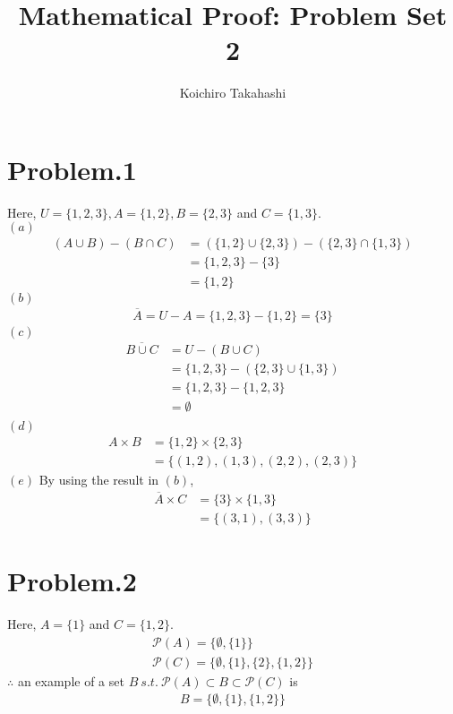 \documentclass[12pt]{article}
\begin{document}
\title{Mathematical Proof: Problem Set 2}
\author{Koichiro Takahashi}
\maketitle 

\section*{Problem.1}
Here, $U = \{1,2,3\}, A = \{1,2\}, B = \{2,3\}$ and $C = \{1,3\}$.\\[1em]
$(a)$
\begin{align*}
(A \cup B) - (B \cap C) &= (\{1,2\} \cup \{2,3\}) - (\{2,3\} \cap \{1, 3\})\\[1em]
&= \{1,2,3\} - \{3\} \\[1em]
&= \{1,2\}
\end{align*}
$(b)$
\begin{align*}
\overline{A} = U - A = \{1,2,3\} - \{1,2\} = \{3\}
\end{align*}
$(c)$
\begin{align*}
\overline{B \cup C} &= U - (B \cup C)\\[1em]
&= \{1,2,3\} - (\{2,3\} \cup \{1,3\})\\[1em]
&= \{1,2,3\} - \{1,2,3\} \\[1em]
&= \emptyset \\[1em]
\end{align*}
$(d)$
\begin{align*}
A \times B &= \{1,2\} \times \{2,3\}\\[1em]
&= \{(1,2),(1,3),(2,2),(2,3)\}
\end{align*}
$(e)$
By using the result in $(b)$,
\begin{align*}
\overline{A} \times C &= \{3\} \times \{1,3\}\\[1em]
&= \{(3,1),(3,3)\}
\end{align*}

\section*{Problem.2}
Here, $A = \{1\}$ and $C = \{1,2\}$.\\[1em]
\begin{gather*}
\mathcal{P}(A) = \{\emptyset, \{1\}\}\\[1em]
\mathcal{P}(C) = \{\emptyset, \{1\}, \{2\}, \{1,2\}\}
\end{gather*}
$\therefore$ an example of a set $B~s.t.~\mathcal{P}(A) \subset B \subset \mathcal{P}(C)$ is 
\begin{gather*}
B = \{\emptyset, \{1\}, \{1,2\}\}
\end{gather*}
\end{document}
